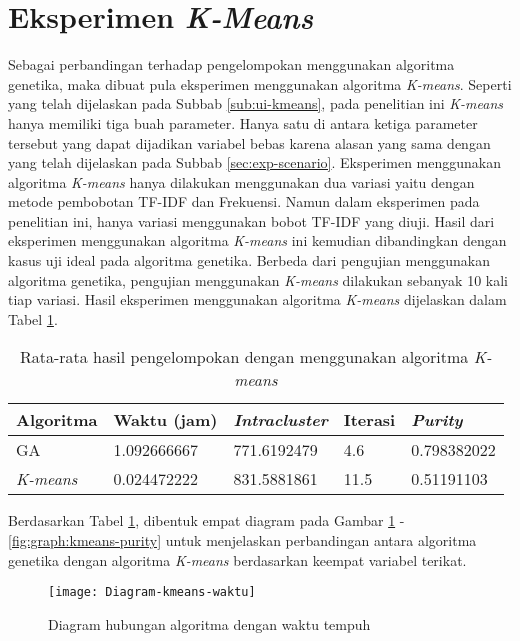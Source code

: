 \section{Eksperimen \textit{K-Means}}
Sebagai perbandingan terhadap pengelompokan menggunakan algoritma genetika, maka dibuat pula eksperimen menggunakan algoritma \textit{K-means}. Seperti yang telah dijelaskan pada Subbab \ref{sub:ui-kmeans}, pada penelitian ini \textit{K-means} hanya memiliki tiga buah parameter. Hanya satu di antara ketiga parameter tersebut yang dapat dijadikan variabel bebas karena alasan yang sama dengan yang telah dijelaskan pada Subbab \ref{sec:exp-scenario}. Eksperimen menggunakan algoritma \textit{K-means} hanya dilakukan menggunakan dua variasi yaitu dengan metode pembobotan TF-IDF dan Frekuensi. Namun dalam eksperimen pada penelitian ini, hanya variasi menggunakan bobot TF-IDF yang diuji. Hasil dari eksperimen menggunakan algoritma \textit{K-means} ini kemudian dibandingkan dengan kasus uji ideal pada algoritma genetika. Berbeda dari pengujian menggunakan algoritma genetika, pengujian menggunakan \textit{K-means} dilakukan sebanyak 10 kali tiap variasi. Hasil eksperimen menggunakan algoritma \textit{K-means} dijelaskan dalam Tabel \ref{tbl:exp-kmeans}.

\begin{table}[H]
	\centering
	\caption{Rata-rata hasil pengelompokan dengan menggunakan algoritma \textit{K-means}}
	\begin{tabular}{|l|l|l|l|l|} \hline
		Algoritma & Waktu (jam) & \textit{Intracluster} & Iterasi& \textit{Purity} \\ \hline
		GA      & 1.092666667 & 771.6192479 & 4.6  & 0.798382022 \\ \hline
		\textit{K-means} & 0.024472222 & 831.5881861 & 11.5 & 0.51191103 \\ \hline
	\end{tabular}
	\label{tbl:exp-kmeans}
\end{table}

Berdasarkan Tabel \ref{tbl:exp-kmeans}, dibentuk empat diagram pada Gambar \ref{fig:graph:kmeans-time} - \ref{fig:graph:kmeans-purity} untuk menjelaskan perbandingan antara algoritma genetika dengan algoritma \textit{K-means} berdasarkan keempat variabel terikat.

\begin{figure}[H]
	\centering
	\texttt{[image: Diagram-kmeans-waktu]}
	\caption{Diagram hubungan algoritma dengan waktu tempuh}
	\label{fig:graph:kmeans-time}
\end{figure}

